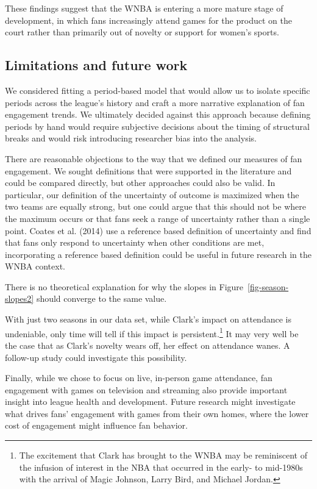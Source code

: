 \documentclass[
  letterpaper,
  DIV=11,
  numbers=noendperiod]{scrartcl}
\begin{document}
These findings suggest that the WNBA is entering a more mature stage of
development, in which fans increasingly attend games for the product on
the court rather than primarily out of novelty or support for women's
sports.

\subsection{Limitations and future
work}\label{limitations-and-future-work}

We considered fitting a period-based model that would allow us to
isolate specific periods across the league's history and craft a more
narrative explanation of fan engagement trends. We ultimately decided
against this approach because defining periods by hand would require
subjective decisions about the timing of structural breaks and would
risk introducing researcher bias into the analysis.

There are reasonable objections to the way that we defined our measures
of fan engagement. We sought definitions that were supported in the
literature and could be compared directly, but other approaches could
also be valid. In particular, our definition of the uncertainty of
outcome is maximized when the two teams are equally strong, but one
could argue that this should not be where the maximum occurs or that
fans seek a range of uncertainty rather than a single point. Coates et
al. (2014) use a reference based definition of uncertainty and find that
fans only respond to uncertainty when other conditions are met,
incorporating a reference based definition could be useful in future
research in the WNBA context.

There is no theoretical explanation for why the slopes in
Figure~\ref{fig-season-slopes2} should converge to the same value.

With just two seasons in our data set, while Clark's impact on
attendance is undeniable, only time will tell if this impact is
persistent.\footnote{The excitement that Clark has brought to the WNBA
  may be reminiscent of the infusion of interest in the NBA that
  occurred in the early- to mid-1980s with the arrival of Magic Johnson,
  Larry Bird, and Michael Jordan.} It may very well be the case that as
Clark's novelty wears off, her effect on attendance wanes. A follow-up
study could investigate this possibility.

Finally, while we chose to focus on live, in-person game attendance, fan
engagement with games on television and streaming also provide important
insight into league health and development. Future research might
investigate what drives fans' engagement with games from their own
homes, where the lower cost of engagement might influence fan behavior.
\end{document}
